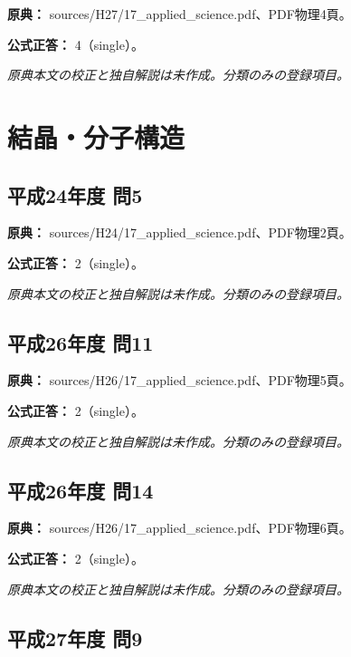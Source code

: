 \noindent\textbf{原典：} sources/H27/17\_applied\_science.pdf、PDF物理4頁。

\textbf{公式正答：} 4（single）。

\par\textit{原典本文の校正と独自解説は未作成。分類のみの登録項目。}

\section{結晶・分子構造}

\subsection{平成24年度 問5}
\label{q:h24-reg-applied-05}

\noindent\textbf{原典：} sources/H24/17\_applied\_science.pdf、PDF物理2頁。

\textbf{公式正答：} 2（single）。

\par\textit{原典本文の校正と独自解説は未作成。分類のみの登録項目。}

\subsection{平成26年度 問11}
\label{q:h26-reg-applied-11}

\noindent\textbf{原典：} sources/H26/17\_applied\_science.pdf、PDF物理5頁。

\textbf{公式正答：} 2（single）。

\par\textit{原典本文の校正と独自解説は未作成。分類のみの登録項目。}

\subsection{平成26年度 問14}
\label{q:h26-reg-applied-14}

\noindent\textbf{原典：} sources/H26/17\_applied\_science.pdf、PDF物理6頁。

\textbf{公式正答：} 2（single）。

\par\textit{原典本文の校正と独自解説は未作成。分類のみの登録項目。}

\subsection{平成27年度 問9}
\label{q:h27-reg-applied-09}

